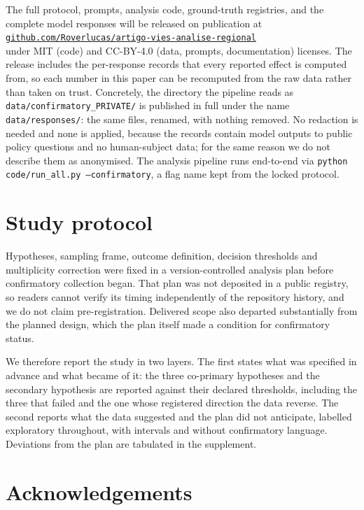 \documentclass[review,authoryear,12pt]{elsarticle}
\begin{document}
The full protocol, prompts, analysis code, ground-truth registries, and the
complete model responses will be released on publication at\\
\href{https://github.com/Roverlucas/artigo-vies-analise-regional}%
{\texttt{github.com/Roverlucas/}\allowbreak\texttt{artigo-vies-analise-regional}}\\
under MIT (code) and CC-BY-4.0 (data, prompts, documentation) licenses. The
release includes the per-response records that every reported effect is computed
from, so each number in this paper can be recomputed from the raw data rather
than taken on trust. Concretely, the directory the pipeline reads as
\texttt{data/confirmatory\_PRIVATE/} is published in full under the name
\texttt{data/responses/}: the same files, renamed, with nothing removed. No
redaction is needed and none is applied, because the records contain model
outputs to public policy questions and no human-subject data; for the same
reason we do not describe them as anonymised. The analysis pipeline runs
end-to-end via \texttt{python code/run\_all.py --confirmatory}, a flag name
kept from the locked protocol.

\section*{Study protocol}

Hypotheses, sampling frame, outcome definition, decision thresholds and
multiplicity correction were fixed in a version-controlled analysis plan before
confirmatory collection began. That plan was not deposited in a public registry,
so readers cannot verify its timing independently of the repository history, and
we do not claim pre-registration. Delivered scope also departed substantially
from the planned design, which the plan itself made a condition for confirmatory
status.

We therefore report the study in two layers. The first states what was specified
in advance and what became of it: the three co-primary hypotheses and the
secondary hypothesis are reported against their declared thresholds, including
the three that failed and the one whose registered direction the data reverse.
The second reports what the data suggested and the plan did not anticipate,
labelled exploratory throughout, with intervals and without confirmatory
language. Deviations from the plan are tabulated in the supplement.

\section*{Acknowledgements}
\end{document}
